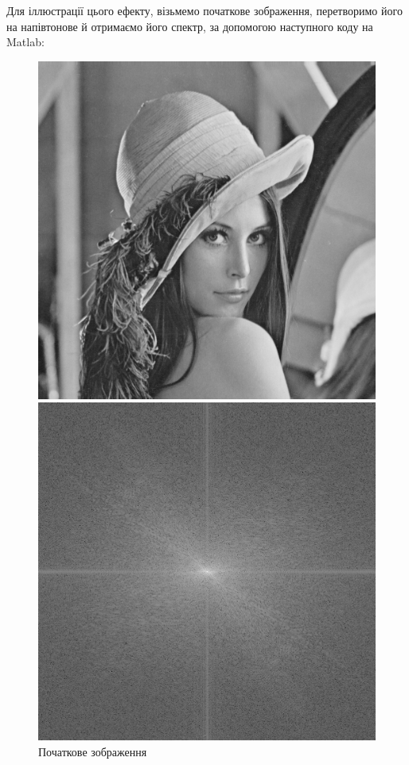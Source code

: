 \documentclass[simple,14pt,utf8,ukrainian]{eskdtext}
\begin{document}
Для іллюстрації цього ефекту, візьмемо початкове зображення, перетворимо його
на напівтонове й отримаємо його спектр, за допомогою наступного коду на
Matlab:

\begin{figure}[!htb]
      \includegraphics[width=\linewidth]{Lenna-gray.png}
      \caption{Початкове зображення}\label{fig:Lenna-gray-img}
    \endminipage\hfill
      \includegraphics[width=\linewidth]{Lenna-ampl.png}

\end{figure}
\end{document}
